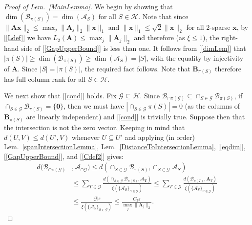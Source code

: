 \documentclass[9pt,twocolumn]{pnas-new}
\renewcommand{\eqref}[1]{\textnormal{[\ref{#1}]}}
\begin{document}
\begin{proof}[Proof of Lem.~\ref{MainLemma}]

We begin by showing that $\dim(\bm{\mathcal{B}}_{\pi(S)}) = \dim(\bm{\mathcal{A}}_S)$ for all $S \in \mathcal{H}$. Note that since $\|\mathbf{A}\mathbf{x}\|_2 \leq \max_j\|\mathbf{A}_j\|_2\|\mathbf{x}\|_1$ and $\|\mathbf{x}\|_1 \leq \sqrt{2} \|\mathbf{x}\|_2$ for all $2$-sparse $\mathbf{x}$, by \eqref{Ldef} we have $L_2(\mathbf{A}) \leq \max_j\|\mathbf{A}_j\|_2$ and therefore (as $\xi \leq 1$), the right-hand side of \eqref{GapUpperBound} is less than one. It follows from \eqref{dimLem} that $|\pi(S)| \geq \dim(\bm{\mathcal{B}}_{\pi(S)}) \geq \dim(\bm{\mathcal{A}}_S) = |S|$, with the equality by injectivity of $\mathbf{A}$. Since $|S| = |\pi(S)|$, the required fact follows. Note that $\mathbf{B}_{\pi(S)}$ therefore has full column-rank for all $S \in \mathcal{H}$.

We next show that \eqref{cond} holds.  Fix $\mathcal{G} \subseteq \mathcal{H}$. Since $\bm{\mathcal{B}}_{\cap \pi(\mathcal{G})} \subseteq \cap_{S \in \mathcal{G}} \bm{\mathcal{B}}_{\pi(S)}$, if $\cap_{S \in \mathcal{G}} \bm{\mathcal{B}}_{\pi(S)} = \{\textbf{0}\}$, then we must have $|\cap_{S \in \mathcal{G}} \pi(S)| = 0$ (as the columns of $\mathbf{B}_{\pi(S)}$ are linearly independent) and \eqref{cond} is trivially true. Suppose then that the intersection is not the zero vector. Keeping in mind that $d(U,V) \leq d(U',V)$ whenever $U \subseteq U'$ and applying (in order) Lem.~\ref{spanIntersectionLemma}, Lem.~\ref{DistanceToIntersectionLemma}, \eqref{eqdim}, \eqref{GapUpperBound}, and \eqref{Cdef2} gives:
\begin{align}\label{randoml}
d(\bm{\mathcal{B}}_{\cap \pi(\mathcal{G})}&, \bm{\mathcal{A}}_{\cap \mathcal{G}}  ) 
\leq d\left( \cap_{S \in \mathcal{G}} \bm{\mathcal{B}}_{\pi(S)}, \cap_{S \in \mathcal{G}} \bm{\mathcal{A}}_S \right) \nonumber \\
&\leq \sum_{T \in \mathcal{G}} \frac{ d\left( \cap_{S \in \mathcal{G}} \bm{\mathcal{B}}_{\pi(S)},\bm{\mathcal{A}_{T}} \right) }{ \xi(  \{\bm{\mathcal{A}}_S\}_{S \in \mathcal{G}}) }
\leq \sum_{T \in \mathcal{G}} \frac{ d\left( \bm{\mathcal{B}}_{\pi(T)},\bm{\mathbf{A}}_{T} \right) }{ \xi( \{\bm{\mathcal{A}}_S\}_{S \in \mathcal{G}}) }\nonumber \\
&\leq \frac{|\mathcal{G}| \varepsilon}{\xi( \{\bm{\mathcal{A}}_S\}_{S \in \mathcal{G}})} 
\leq \frac{C_2 \varepsilon}{\max_j\|\mathbf{A}_j\|_2}. 
\end{align}


\end{proof}
\end{document}
